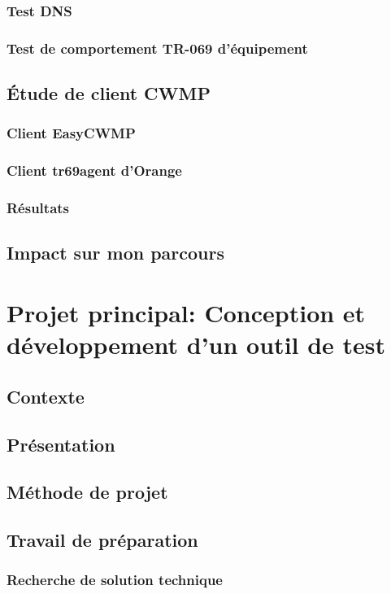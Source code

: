 \documentclass[12pt,a4paper]{report}
\begin{document}
\subsubsection{Test DNS}
\subsubsection{Test de comportement TR-069 d'équipement}
\subsection{Étude de client CWMP}
\subsubsection{Client EasyCWMP}
\subsubsection{Client tr69agent d'Orange}
\subsubsection{Résultats} %
\subsection{Impact sur mon parcours}

\section{Projet principal: Conception et développement d'un outil de test}
\subsection{Contexte}
\subsection{Présentation}
\subsection{Méthode de projet}
\subsection{Travail de préparation}
\subsubsection{Recherche de solution technique}
\end{document}
